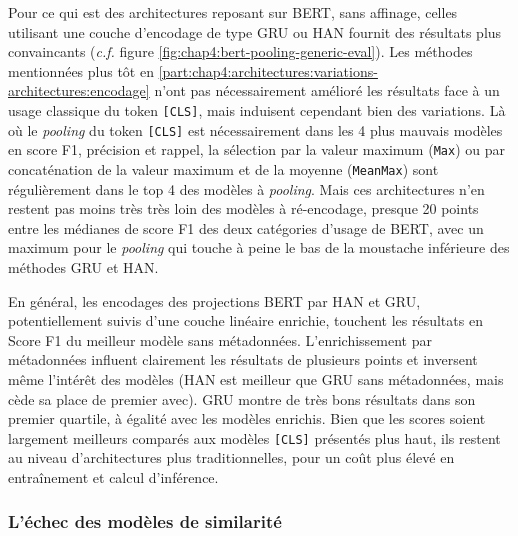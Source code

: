 Pour ce qui est des architectures reposant sur BERT, sans affinage, celles utilisant une couche d'encodage de type GRU ou HAN fournit des résultats plus convaincants (\textit{c.f.} figure \ref{fig:chap4:bert-pooling-generic-eval}). Les méthodes mentionnées plus tôt en \ref{part:chap4:architectures:variations-architectures:encodage} n'ont pas nécessairement amélioré les résultats face à un usage classique du token \texttt{[CLS]}, mais induisent cependant bien des variations. Là où le \textit{pooling} du token \texttt{[CLS]} est nécessairement dans les 4 plus mauvais modèles en score F1, précision et rappel, la sélection par la valeur maximum (\texttt{Max}) ou par concaténation de la valeur maximum et de la moyenne (\texttt{MeanMax}) sont régulièrement dans le top 4 des modèles à \textit{pooling}. Mais ces architectures n'en restent pas moins très très loin des modèles à ré-encodage, presque 20 points entre les médianes de score F1 des deux catégories d'usage de BERT, avec un maximum pour le \textit{pooling} qui touche à peine le bas de la moustache inférieure des méthodes GRU et HAN.

En général, les encodages des projections BERT par HAN et GRU, potentiellement suivis d'une couche linéaire enrichie, touchent les résultats en Score F1 du meilleur modèle sans métadonnées. L'enrichissement par métadonnées influent clairement les résultats de plusieurs points et inversent même l'intérêt des modèles (HAN est meilleur que GRU sans métadonnées, mais cède sa place de premier avec). GRU montre de très bons résultats dans son premier quartile, à égalité avec les modèles enrichis. Bien que les scores soient largement meilleurs comparés aux modèles \texttt{[CLS]} présentés plus haut, ils restent au niveau d'architectures plus traditionnelles, pour un coût plus élevé en entraînement et calcul d'inférence.

\subsubsection{L’échec des modèles de similarité}

